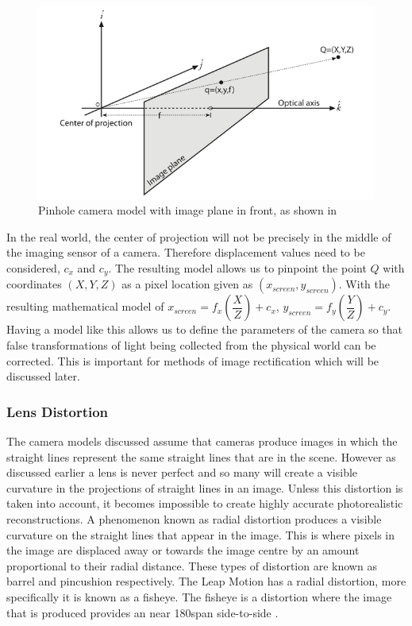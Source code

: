 \documentclass[11pt,oneside]{report}
\begin{document}
				\begin{figure}[!ht]
				\begin{center}
					\includegraphics[scale=0.5]{pinhole2}
					\caption{Pinhole camera model with image plane in front, as shown in \protect{} {\label{fig:pinhole2}}}
				\end{center}
				\end{figure}
				In the real world, the center of projection will not be precisely in the middle of the imaging sensor of a camera.
				Therefore displacement values need to be considered, $c_{x}$ and $c_{y}$.
				The resulting model allows us to pinpoint the point $Q$ with coordinates $(X,Y,Z)$ as a pixel location given as $(x_{screen}, y_{screen})$.
				With the resulting mathematical model of $x_{screen}=f_{x}\left(\dfrac{X}{Z}\right)+c_{x}$, $y_{screen}=f_{y}\left(\dfrac{Y}{Z}\right)+c_{y}$.
				Having a model like this allows us to define the parameters of the camera so that false transformations of light being collected from the physical world can be corrected.
				This is important for methods of image rectification which will be discussed later.
				\subsubsection{Lens Distortion}
					The camera models discussed assume that cameras produce images in which the straight lines represent the same straight lines that are in the scene.
					However as discussed earlier a lens is never perfect and so many will create a visible curvature in the projections of straight lines in an image.
					Unless this distortion is taken into account, it becomes impossible to create highly accurate photorealistic reconstructions.
					A phenomenon known as radial distortion produces a visible curvature on the straight lines that appear in the image.
					This is where pixels in the image are displaced away or towards the image centre by an amount proportional to their radial distance.
					These types of distortion are known as barrel and pincushion respectively.
					The Leap Motion has a radial distortion, more specifically it is known as a fisheye.
					The fisheye is a distortion where the image that is produced provides an near 180\degree span side-to-side \cite{book:sam}.
					
\end{document}
